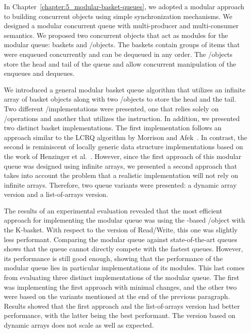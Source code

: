 In Chapter~\ref{chapter:5_modular-basket-queues}, we adopted a modular approach to building concurrent objects using simple synchronization mechanisms.
 We designed a modular concurrent queue with multi-producer and multi-consumer semantics. We proposed two concurrent objects that act as modules for the modular queue: baskets and \LL/\IC objects. The baskets contain groups of items that were enqueued concurrently and can be dequeued in any order. The \LL/\IC objects store the head and tail of the queue and allow concurrent manipulation of the enqueues and dequeues.

We introduced a general modular basket queue algorithm that utilizes an infinite array of basket objects along with two \LL/\IC objects to store the head and the tail. Two different \LL/\IC implementations were presented, one that relies solely on \R/\W operations and another that utilizes the \CAS instruction. In addition, we presented two distinct basket implementations. The first implementation follows an approach similar to the LCRQ algorithm by Morrison and Afek~\cite{ppopp2013x86queues}. In contrast, the second is reminiscent of locally generic data structure implementations based on the work of Henzinger et al.~\cite{DBLP_conf_concur_HaasHHKLPSSV16}. However, since the first approach of this modular queue was designed using infinite arrays, we presented a second approach that takes into account the problem that a realistic implementation will not rely on infinite arrays. Therefore, two queue variants were presented: a dynamic array version and a list-of-arrays version.

The results of an experimental evaluation revealed that the most efficient approach for implementing the modular queue was using the \CAS-based \LL/\IC object with the K-basket. With respect to the version of Read/Write, this one was slightly less performant. Comparing the modular queue against state-of-the-art queues shows that the queue cannot directly compete with the fastest queues. However, its performance is still good enough, showing that the performance of the modular queue lies in particular implementations of its modules. This last comes from evaluating three distinct implementations of the modular queue. The first was implementing the first approach with minimal changes, and the other two were based on the variants mentioned at the end of the previous paragraph. Results showed that the first approach and the list-of-arrays version had better performance, with the latter being the best performant. The version based on dynamic arrays does not scale as well as expected.

